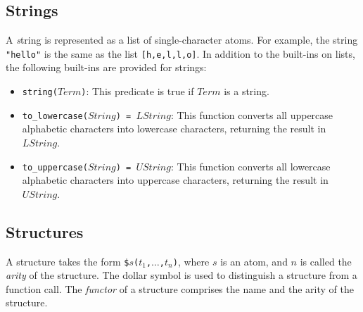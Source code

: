\begin{itemize}
\end{itemize}

\subsection{\label{subsec:strings}Strings}
A {\emph string} is represented as a list of single-character atoms. For example, the string \texttt{"hello"} is the same as the list \texttt{[h,e,l,l,o]}. In addition to the built-ins on lists, the following built-ins are provided for strings:
\begin{itemize}
\item \texttt{string($Term$)}: This predicate is true if $Term$ is a string. 
\item \texttt{to\_lowercase($String$) = $LString$}: This function converts all uppercase alphabetic characters into lowercase characters, returning the result in $LString$.
\item \texttt{to\_uppercase($String$) = $UString$}: This function converts all lowercase alphabetic characters into uppercase characters, returning the result in $UString$.
\end{itemize}

\subsection{Structures}
A structure takes the form \texttt{\$$s$($t_1$,$\ldots$,$t_{n}$)}, where $s$ is an atom, and $n$ is called the \emph{arity} of the structure. The dollar symbol is used to distinguish a structure from a function call. The \emph{functor} of a structure comprises the name and the arity of the structure. 

